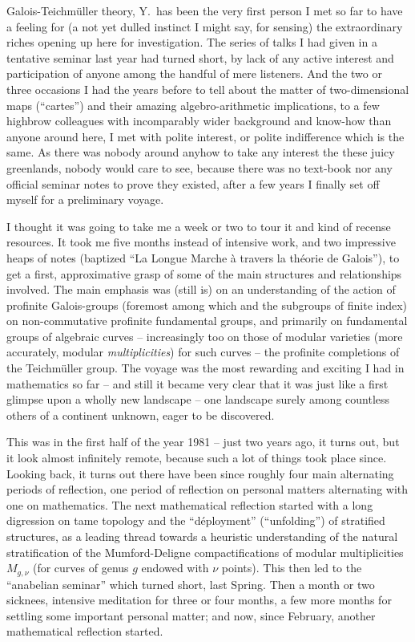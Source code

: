 Galois-Teichmüller theory, Y.\ has been the very first person I met
so far to have a feeling for (a not yet dulled instinct I might say,
for sensing) the extraordinary riches opening up here for
investigation. The series of talks I had given in a tentative seminar
last year had turned short, by lack of any active interest and
participation of anyone among the handful of mere listeners. And the
two or three occasions I had the years before to tell about the matter
of two-dimensional maps (``cartes'') and their amazing
algebro-arithmetic implications, to a few highbrow colleagues with
incomparably wider background and know-how than anyone around here, I
met with polite interest, or polite indifference which is the same. As
there was nobody around anyhow to take any interest the these juicy
greenlands, nobody would care to see, because there was no text-book
nor any official seminar notes to prove they existed, after a few
years I finally set off myself for a preliminary voyage.

I thought it was going to take me a week or two to tour it and kind of
recense
resources. It took me five months instead of intensive work, and two
impressive heaps of notes (baptized ``La Longue Marche à travers la
théorie de Galois''), to get a first, approximative grasp of some of
the main structures and relationships involved. The main emphasis was
(still is) on an understanding of the action of profinite
Galois-groups (foremost among which \GalQQ{} and the subgroups of
finite index) on non-commutative profinite fundamental groups, and
primarily on fundamental groups of algebraic curves -- increasingly
too on those of modular varieties (more accurately, modular
\emph{multiplicities}) for such curves -- the profinite completions of
the Teichmüller group. The voyage was the most rewarding and exciting
I had in mathematics so far -- and still it became very clear that it
was just like a first glimpse upon a wholly new landscape -- one
landscape surely among countless others of a continent unknown, eager
to be discovered.

This was in the first half of the year 1981 -- just two years ago, it
turns out, but it look almost infinitely remote, because such a lot of
things took place since. Looking back, it turns out there have been
since roughly four main alternating periods of reflection, one period
of reflection on personal matters alternating with one on
mathematics. The next mathematical reflection started with a long
digression on tame topology and the ``déployment''
(``unfolding'') of stratified structures, as a leading
thread towards a heuristic understanding of the natural stratification
of the Mumford-Deligne compactifications of modular multiplicities
$M_{g,\nu}$ (for curves of genus $g$ endowed with $\nu$ points). This
then led to the ``anabelian seminar'' which turned short, last
Spring. Then a month or two sicknees, intensive meditation for three
or four months, a few more months for settling some important personal
matter; and now, since February, another mathematical reflection
started.

